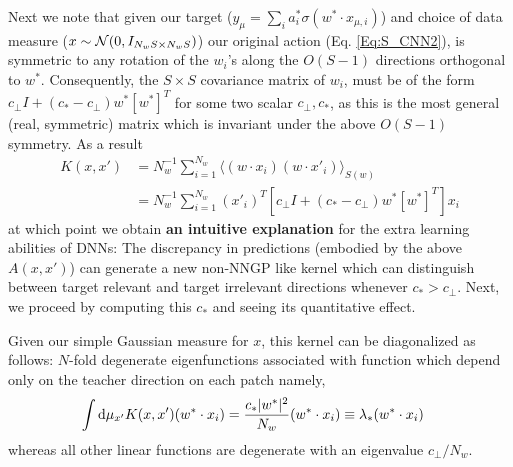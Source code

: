 Next we note that given our target ($y_{\mu} = \sum_{i} a^*_i \sigma({w}^* \cdot {x}_{\mu,i})$) and choice of data measure (${x} \sim {\cal N}(0,I_{N_w S \times N_w S})$) our original action (Eq. \ref{Eq:S_CNN2}), is symmetric to any rotation of the $w_i$'s along the $O(S-1)$ directions orthogonal to $w^*$. Consequently, the $S \times S$ covariance matrix of $w_i$, must be of the form $c_{\perp} I + (c_*-c_{\perp}) {w}^* [{w}^*]^T$ for some two scalar $c_{\perp},c_*$, as this is the most general (real, symmetric) matrix which is invariant under the above $O(S-1)$ symmetry. As a result 
\begin{align}
\label{Eq:AdaptedKernel1}
K(x,x')&=N_w^{-1} \sum_{i=1}^{N_{w}} \langle ({w} \cdot x_i) ({w} \cdot x'_i) \rangle_{S(w)} \\ \nonumber &= N_{w}^{-1} \sum_{i=1}^{N_{w}} (x'_i)^T [ c_{\perp} I + (c_*-c_{\perp}) {w}^* [{w}^*]^T] x_i 
\end{align}
at which point we obtain {\bf an intuitive explanation} for the extra learning abilities of DNNs: The discrepancy in predictions (embodied by the above $A(x,x')$) can generate a new non-NNGP like kernel which can distinguish between target relevant and target irrelevant directions whenever $c_* > c_{\perp}$. Next, we proceed by computing this $c_*$ and seeing its quantitative effect. 


Given our simple Gaussian measure for $x$, this kernel can be diagonalized as follows: $N$-fold degenerate eigenfunctions associated with function which depend only on the teacher direction on each patch namely,  
\begin{align}
\int \text{d}\mu_{x'} K(x,x') ({w}^* \cdot x_i) &= \frac{c_* |{w}^*|^2}{N_w} ({w}^* \cdot x_i) \equiv \lambda_* ({w}^* \cdot x_i)
\end{align}
whereas all other linear functions are degenerate with an eigenvalue $c_{\perp}/N_w$. 

